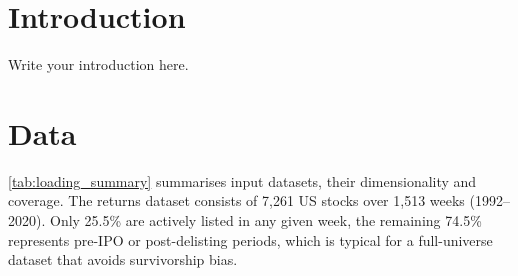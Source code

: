 \documentclass[10pt]{article}
\begin{document}


\newpage
\thispagestyle{empty}
\begin{abstract}
This report investigates quantitative trading strategies with a focus on short interest, liquidity, and time-series momentum. We replicate and extend the comomentum framework of \citet{LouPolk2021}, which infers aggregate arbitrage activity from return correlations among extreme momentum decile stocks. Using a universe of 7,261 US equities over 1,513 weeks (1992--2020), we construct the comomentum signal as the average pairwise abnormal correlation within winner and loser deciles after controlling for the Fama--French three factors. We demonstrate that an inverse-comomentum-scaled momentum strategy outperforms the standard momentum factor by reducing exposure during periods of crowded trading. We further investigate the determinants of comomentum using time-series OLS regressions with Newey--West standard errors, finding that trailing market returns are the strongest available predictor of future comomentum levels.
\end{abstract}

\newpage
\thispagestyle{empty}
\tableofcontents

\newpage
\setcounter{page}{1}
\section{Introduction}
Write your introduction here.

\section{Data}
\noindent\autoref{tab:loading_summary} summarises input datasets, their dimensionality and coverage. The returns dataset consists of 7{,}261 US stocks over 1{,}513 weeks (1992--2020). Only 25.5\% are actively listed in any given week, the remaining 74.5\% represents pre-IPO or post-delisting periods, which is typical for a full-universe dataset that avoids survivorship bias.


\end{document}

